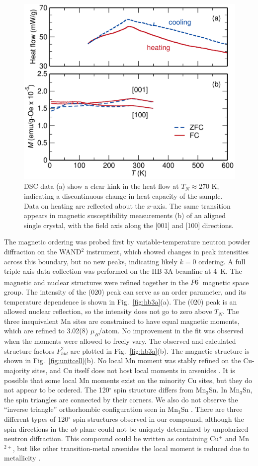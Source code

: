 \documentclass[10pt,doublespacing,edeposit]{uiucthesis2020}
\begin{document}
\begin{mainmatter}
\begin{figure}
\centering\includegraphics[width=0.6\columnwidth]{figures/ch5/dsc-mpms_norm_cropped.pdf}
\caption{
DSC data (a) show a clear kink in the heat flow at $T_N \approx 270$ K, indicating a discontinuous change in heat capacity of the sample. Data on heating are reflected about the $x$-axis. The same transition appears in magnetic susceptibility measurements (b) of an aligned single crystal, with the field axis along the [001] and [100] directions.
} 
\label{fig:dsc-mpms}
\end{figure}

The magnetic ordering was probed first by variable-temperature neutron powder diffraction
on the WAND$^2$ instrument, which showed changes in peak intensities across this boundary, but no new peaks, indicating likely $k = 0$ ordering.
A full triple-axis data collection was performed on the HB-3A beamline at 4~K.
The magnetic and nuclear structures were refined together in the $P\overline{6}^\prime$ magnetic space group. 
The intensity of the (020) peak can serve as an order parameter, and its temperature dependence is shown in Fig.\ \ref{fig:hb3a}(a).
The (020) peak is an allowed nuclear reflection, so the intensity does not go to zero above $T_N$.
The three inequivalent Mn sites are constrained to have equal magnetic moments, which are refined to 3.02(8) $\mu_B$/atom.
No improvement in the fit was observed when the moments were allowed to freely vary.
The observed and calculated structure factors $F_{hkl}^2$ are plotted in Fig.\ \ref{fig:hb3a}(b).
The magnetic structure is shown in Fig.\ \ref{fig:unitcell}(b). 
No local Mn moment was stably refined on the Cu-majority sites, and Cu itself does not host local moments in arsenides \cite{pauwels_electrical_1973,sampathkumaran_enhanced_2003,sengupta_magnetic_2005}.
It is possible that some local Mn moments exist on the minority Cu sites, but they do not appear to be ordered.
{\color{black}The 120$^\circ$ spin structure differs from Mn$_3$Sn. In Mn$_3$Sn, the spin triangles are connected by their corners. We also do not observe the ``inverse triangle'' orthorhombic configuration seen in Mn$_3$Sn \cite{Brown_1990}. There are three different types of 120$^\circ$ spin structures observed in our compound, although the spin directions in the $ab$ plane could not be uniquely determined by unpolarized neutron diffraction.}
This compound could be written as containing Cu$^+$ and Mn$^{2+}$, but like other transition-metal arsenides the local moment is reduced due to metallicity \cite{Katsuraki1966,Pytlik1985}.


\end{mainmatter}
\end{document}
